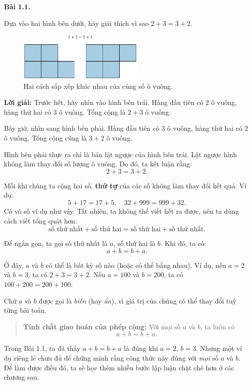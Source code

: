 \documentclass[14pt,a4paper]{extbook}
\newenvironment{problem}[1][]{
  \par\noindent\textbf{Bài #1.}\ \ignorespaces
}{\par}
\begin{document}
\begin{problem}[1.1]
Dựa vào hai hình bên dưới, hãy giải thích vì sao $2 + 3 = 3 + 2$.

\begin{figure}[ht!]
  \centering
  \includegraphics[width=0.55\textwidth]{img/fig-prob1.1.pdf}
  \caption*{\small Hai cách sắp xếp khác nhau của cùng số ô vuông.}
\end{figure}

\textbf{Lời giải:}  
Trước hết, hãy nhìn vào hình bên trái. Hàng đầu tiên có $2$ ô vuông, hàng thứ hai có $3$ ô vuông.  
Tổng cộng là $2 + 3$ ô vuông.  

Bây giờ, nhìn sang hình bên phải. Hàng đầu tiên có $3$ ô vuông, hàng thứ hai có $2$ ô vuông.  
Tổng cộng cũng là $3 + 2$ ô vuông.  

Hình bên phải thực ra chỉ là bản lật ngược của hình bên trái.  
Lật ngược hình không làm thay đổi số lượng ô vuông.  
Do đó, ta kết luận rằng:
\[
2 + 3 = 3 + 2.
\]
\end{problem}

Mỗi khi chúng ta cộng hai số, \textbf{thứ tự} của các số không làm thay đổi kết quả.  
Ví dụ:
\[
5 + 17 = 17 + 5, \quad 32 + 999 = 999 + 32.
\]
Có vô số ví dụ như vậy.  
Tất nhiên, ta không thể viết hết ra được, nên ta dùng cách viết tổng quát hơn:
\[
\text{số thứ nhất} + \text{số thứ hai} = \text{số thứ hai} + \text{số thứ nhất.}
\]

Để ngắn gọn, ta gọi số thứ nhất là $a$, số thứ hai là $b$.  
Khi đó, ta có:
\[
a + b = b + a.
\]

Ở đây, $a$ và $b$ có thể là bất kỳ số nào (hoặc có thể bằng nhau).  
Ví dụ, nếu $a = 2$ và $b = 3$, ta có $2 + 3 = 3 + 2$.  
Nếu $a = 100$ và $b = 200$, ta có $100 + 200 = 200 + 100$.  

Chữ $a$ và $b$ được gọi là \emph{biến} (hay \emph{ẩn}), vì giá trị của chúng có thể thay đổi tuỳ từng bài toán.

\begin{quote}
\textbf{Tính chất giao hoán của phép cộng:}  
Với mọi số $a$ và $b$, ta luôn có
\[
a + b = b + a.
\]
\end{quote}

Trong Bài 1.1, ta đã thấy $a + b = b + a$ là đúng khi $a = 2$, $b = 3$.  
Nhưng một ví dụ riêng lẻ chưa đủ để chứng minh rằng công thức này đúng với \emph{mọi} số $a$ và $b$.  
Để làm được điều đó, ta sẽ học thêm nhiều bước lập luận chặt chẽ hơn ở các chương sau.
\end{document}
